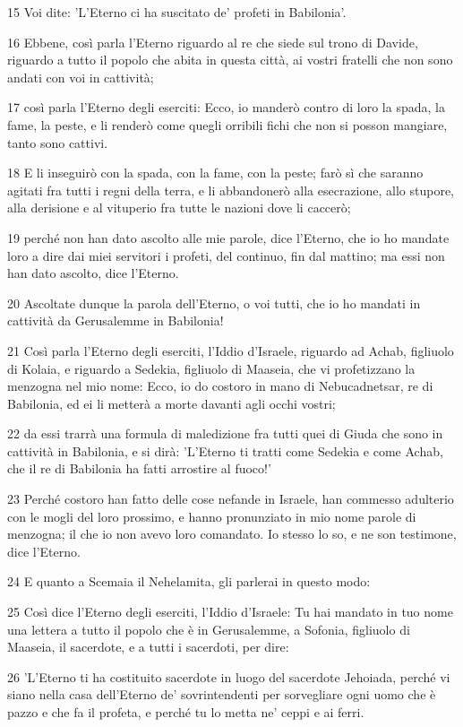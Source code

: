 \par 15 Voi dite: 'L'Eterno ci ha suscitato de' profeti in Babilonia'.
\par 16 Ebbene, così parla l'Eterno riguardo al re che siede sul trono di Davide, riguardo a tutto il popolo che abita in questa città, ai vostri fratelli che non sono andati con voi in cattività;
\par 17 così parla l'Eterno degli eserciti: Ecco, io manderò contro di loro la spada, la fame, la peste, e li renderò come quegli orribili fichi che non si posson mangiare, tanto sono cattivi.
\par 18 E li inseguirò con la spada, con la fame, con la peste; farò sì che saranno agitati fra tutti i regni della terra, e li abbandonerò alla esecrazione, allo stupore, alla derisione e al vituperio fra tutte le nazioni dove li caccerò;
\par 19 perché non han dato ascolto alle mie parole, dice l'Eterno, che io ho mandate loro a dire dai miei servitori i profeti, del continuo, fin dal mattino; ma essi non han dato ascolto, dice l'Eterno.
\par 20 Ascoltate dunque la parola dell'Eterno, o voi tutti, che io ho mandati in cattività da Gerusalemme in Babilonia!
\par 21 Così parla l'Eterno degli eserciti, l'Iddio d'Israele, riguardo ad Achab, figliuolo di Kolaia, e riguardo a Sedekia, figliuolo di Maaseia, che vi profetizzano la menzogna nel mio nome: Ecco, io do costoro in mano di Nebucadnetsar, re di Babilonia, ed ei li metterà a morte davanti agli occhi vostri;
\par 22 da essi trarrà una formula di maledizione fra tutti quei di Giuda che sono in cattività in Babilonia, e si dirà: 'L'Eterno ti tratti come Sedekia e come Achab, che il re di Babilonia ha fatti arrostire al fuoco!'
\par 23 Perché costoro han fatto delle cose nefande in Israele, han commesso adulterio con le mogli del loro prossimo, e hanno pronunziato in mio nome parole di menzogna; il che io non avevo loro comandato. Io stesso lo so, e ne son testimone, dice l'Eterno.
\par 24 E quanto a Scemaia il Nehelamita, gli parlerai in questo modo:
\par 25 Così dice l'Eterno degli eserciti, l'Iddio d'Israele: Tu hai mandato in tuo nome una lettera a tutto il popolo che è in Gerusalemme, a Sofonia, figliuolo di Maaseia, il sacerdote, e a tutti i sacerdoti, per dire:
\par 26 'L'Eterno ti ha costituito sacerdote in luogo del sacerdote Jehoiada, perché vi siano nella casa dell'Eterno de' sovrintendenti per sorvegliare ogni uomo che è pazzo e che fa il profeta, e perché tu lo metta ne' ceppi e ai ferri.
